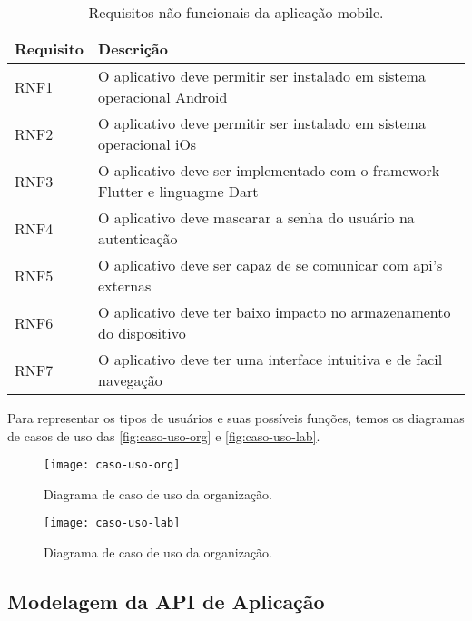 \begin{table}[H]
  \caption{Requisitos não funcionais da aplicação mobile.}
  \label{tab:requisitos_nao_funcionais_app}
  \begin{tabularx}{\textwidth}{l|l}
    \hline
    \textbf{Requisito} & \textbf{Descrição}                                                          \\ \hline
    RNF1               & O aplicativo deve permitir ser instalado em sistema operacional Android     \\
    RNF2               & O aplicativo deve permitir ser instalado em sistema operacional iOs         \\
    RNF3               & O aplicativo deve ser implementado com o framework Flutter e linguagme Dart \\
    RNF4               & O aplicativo deve mascarar a senha do usuário na autenticação               \\
    RNF5               & O aplicativo deve ser capaz de se comunicar com \gls{api}'s externas        \\
    RNF6               & O aplicativo deve ter baixo impacto no armazenamento do dispositivo         \\
    RNF7               & O aplicativo deve ter uma interface intuitiva e de facil navegação          \\ \hline
  \end{tabularx}
  \fonte{}
\end{table}

Para representar os tipos de usuários e suas possíveis funções, temos os diagramas de casos de uso das \autoref{fig:caso-uso-org} e \autoref{fig:caso-uso-lab}.

\begin{figure}[H]
  \captionsetup{width=0.43\textwidth}
  \caption{Diagrama de caso de uso da organização.}
  \label{fig:caso-uso-org}
  \texttt{[image: caso-uso-org]}
  \fonte{}
\end{figure}

\begin{figure}[H]
  \captionsetup{width=0.43\textwidth}
  \caption{Diagrama de caso de uso da organização.}
  \label{fig:caso-uso-lab}
  \texttt{[image: caso-uso-lab]}
  \fonte{}
\end{figure}

\subsection{Modelagem da API de Aplicação}\label{subsec:modelagem_api}

